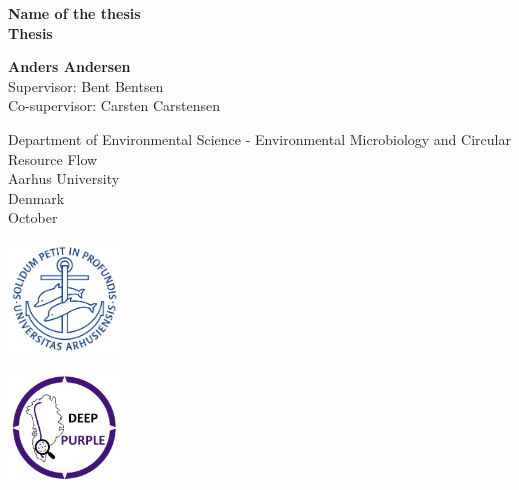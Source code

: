 \begin{titlepage}
   \begin{center}
       \vspace*{1cm}

       \textbf{\huge Name of the thesis}
       \\
      \textbf{Thesis}

       \vspace{0.5cm}
            
       \vspace{1.5cm}

       \textbf{Anders Andersen}
       \\
       Supervisor: Bent Bentsen 
       \\
       Co-supervisor: Carsten Carstensen

       \vfill
            
            
       \vspace{0.8cm}
     
      
            
       Department of Environmental Science - Environmental Microbiology and Circular Resource Flow\\
       Aarhus University\\
       Denmark\\
       October
      \begin{minipage}[c][26mm]{28mm}
                \includegraphics[width = 30mm]{fig/ausegl.png}
            \end{minipage}%
            \begin{minipage}[c]{\textwidth - 20mm}
                \hfill
                \includegraphics[width = 30mm]{fig/DP_logo.png}
        \end{minipage}%
            
   \end{center}
\end{titlepage}